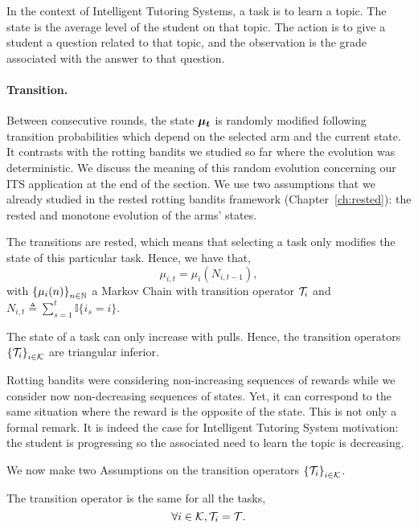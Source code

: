 In the context of Intelligent Tutoring Systems, a task is to learn a topic. The state is the average level of the student on that topic. The action is to give a student a question related to that topic, and the observation is the grade associated with the answer to that question.

\paragraph{Transition.}
Between consecutive rounds, the state $\boldsymbol{\mu_t}$ is randomly modified following transition probabilities which depend on the selected arm and the current state. It contrasts with the rotting bandits we studied so far where the evolution was deterministic. We discuss the meaning of this random evolution concerning our ITS application at the end of the section.  We use two assumptions that we already studied in the rested rotting bandits framework (Chapter~\ref{ch:rested}): the rested and monotone evolution of the arms' states.
\begin{assumption}
\label{assum:rested}
The transitions are rested, which means that selecting a task only modifies the state of this particular task. Hence, we have that,
\[
\mu_{i,t} = \mu_i(N_{i,t-1}),
\]
with $\left\{\mu_i(n)\right\}_{n\in {\mathbb N}}$ a Markov Chain with transition operator $\mathcal{T}_i$ and $N_{i,t}\triangleq \sum_{s\!=\!1}^{t} \mathbb{I}\{i_s \!=\! i\}$.
\end{assumption}
\begin{assumption}
\label{assum:increase}
The state of a task can only increase with pulls. Hence, the transition operators $\left\{\mathcal{T}_i\right\}_{i \in \mathcal{K}}$ are triangular inferior.
\end{assumption}
Rotting bandits were considering non-increasing sequences of rewards while we consider now non-decreasing sequences of states. Yet, it can correspond to the same situation where the reward is the opposite of the state. This is not only a formal remark. It is indeed the case for Intelligent Tutoring System motivation: the student is progressing so the associated need to learn the topic is decreasing.

We now make two Assumptions on the transition operators $\left\{\mathcal{T}_i\right\}_{i \in \mathcal{K}}$.

\begin{assumption}
\label{assum:symmetric}
The transition operator is the same for all the tasks,
\[ \forall i \in \mathcal{K}, \mathcal{T}_i = \mathcal{T}.\]
\end{assumption}

